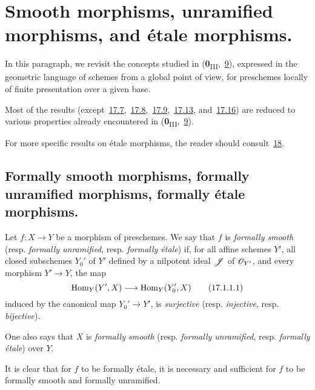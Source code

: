 \section{Smooth morphisms, unramified morphisms, and \'etale morphisms.}
\label{section:IV.17}

In this paragraph, we revisit the concepts studied in (\textbf{0}\textsubscript{III},~\hyperref[section:0.9]{9}), expressed in the geometric language of schemes from a global point of view, for preschemes locally of finite presentation over a given base.

Most of the results (except~\hyperref[subsection:IV.17.7]{17.7},~\hyperref[subsection:IV.17.8]{17.8},~\hyperref[subsection:IV.17.9]{17.9},~\hyperref[subsection:IV.17.13]{17.13}, and~\hyperref[subsection:IV.17.16]{17.16}) are reduced to various properties already encountered in (\textbf{0}\textsubscript{III},~\hyperref[section:0.9]{9}).

For more specific results on \'etale morphisms, the reader should consult~\textsection\hyperref[section:IV.18]{18}.

\subsection{Formally smooth morphisms, formally unramified morphisms, formally \'etale morphisms.}
\label{subsection:IV.17.1}

\begin{definition}[17.1.1]
\label{IV.17.1.1}
Let $f:X\to Y$ be a morphism of preschemes.
We say that $f$ is \emph{formally smooth} (resp. \emph{formally unramified}, resp. \emph{formally \'etale}) if, for all affine schemes $Y'$, all closed subschemes $Y_0'$ of $Y'$ defined by a nilpotent ideal $\mathscr{J}$ of $\mathscr{O}_{Y'}$, and every morphism $Y'\to Y$, the map 
\[
\label{IV.17.1.1.1}
  \Hom_Y(Y',X)\to\Hom_Y(Y_0',X)
  \tag{17.1.1.1}
\]
induced by the canonical map $Y_0'\to Y'$, is \emph{surjective} (resp. \emph{injective}, resp. \emph{bijective}).

One also says that $X$ is \emph{formally smooth} (resp. \emph{formally unramified}, resp. \emph{formally \'etale}) over $Y$.

It is clear that for $f$ to be formally \'etale, it is necessary and sufficient for $f$ to be formally smooth and formally unramified.
\end{definition}

